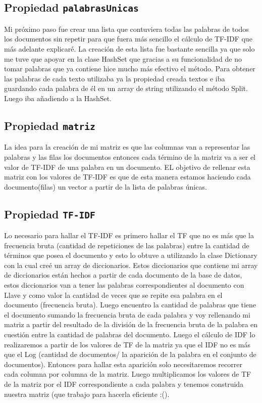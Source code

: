 \documentclass [a4paper,12pt]{article}
\begin{document}
\subsection{Propiedad \texttt{palabrasUnicas}}\label{sub:center}
Mi próximo paso fue crear una lista que contuviera todas las palabras de todos los documentos sin repetir para que fuera más sencillo el cálculo de TF-IDF que más adelante explicaré. La creación de esta lista fue bastante sencilla ya que solo me tuve que apoyar en la clase HashSet que gracias a su funcionalidad de no tomar palabras que ya contiene hice mucho más efectivo el método. Para obtener las palabras de cada texto utilizaba ya la propiedad creada textos e iba guardando cada palabra de él en un array de string utilizando el método Split. Luego iba añadiendo a la HashSet.
\subsection{Propiedad \texttt{matriz}}\label{sub:center}
 La idea para la creación de mi matriz es que las columnas van a representar las palabras y las filas los documentos entonces cada término de la matriz va a ser el valor de TF-IDF de una palabra en un documento. EL objetivo de rellenar esta matriz con los valores de TF-IDF es que de esta manera estamos haciendo cada documento(filas) un vector a partir de la lista de palabras únicas.
\subsection{Propiedad \texttt{TF-IDF}}\label{sub:center}
Lo necesario para hallar el TF-IDF es primero hallar el TF que no es más que la frecuencia bruta (cantidad de repeticiones de las palabras) entre la cantidad de términos que posea el documento y esto lo obtuve a utilizando la clase Dictionary con la cual creé un array de diccionarios. Estos diccionarios que contiene mi array de diccionarios están hechos a partir de cada documento de la base de datos, estos diccionarios van a tener las palabras correspondientes al documento con Llave y como valor la cantidad de veces que se repite esa palabra en el documento (frecuencia bruta). Luego encuentro la cantidad de palabras que tiene el documento sumando la frecuencia bruta de cada palabra y voy rellenando mi matriz a partir del resultado de la división de la frecuencia bruta de la palabra en cuestión entre la cantidad de palabras del documento.
Luego el cálculo de IDF lo realizaremos a partir de los valores de TF de la matriz ya que el IDF no es más que el Log (cantidad de documentos/ la aparición de la palabra en el conjunto de documentos). Entonces para hallar esta aparición solo necesitaremos recorrer cada columna por columna de la matriz. Luego multiplicamos los valores de TF de la matriz por el IDF correspondiente a cada palabra y tenemos construida nuestra matriz (que trabajo para hacerla eficiente :().
\end{document}
